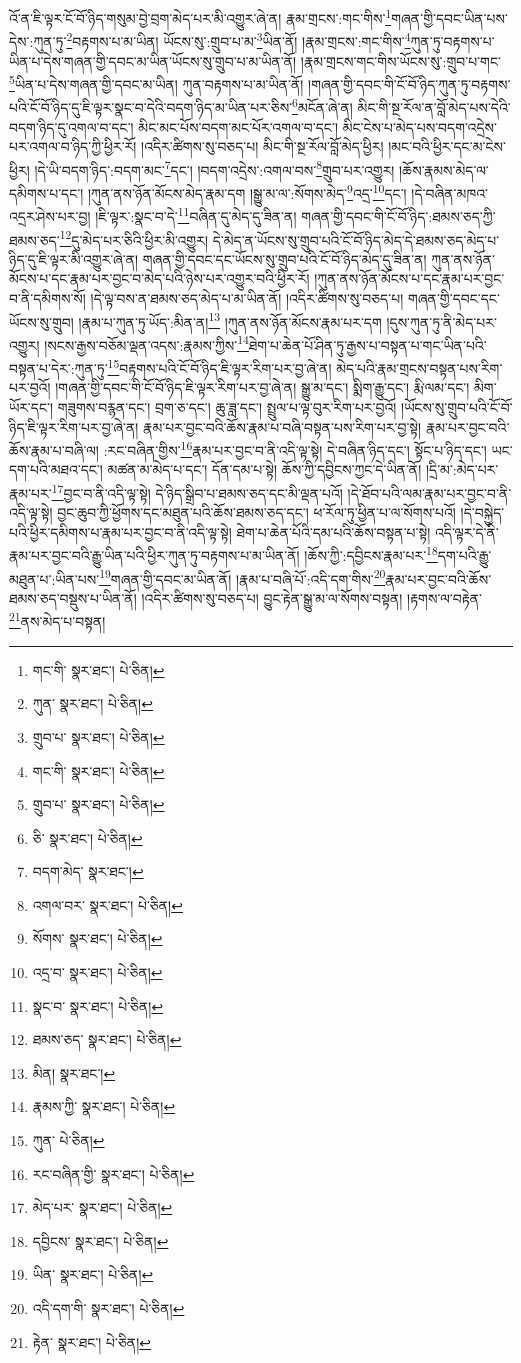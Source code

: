 འོ་ན་ཇི་ལྟར་ངོ་བོ་ཉིད་གསུམ་བྱེ་བྲག་མེད་པར་མི་འགྱུར་ཞེ་ན། རྣམ་གྲངས་:གང་གིས་\footnote{གང་གི་  སྣར་ཐང་།  པེ་ཅིན། }གཞན་གྱི་དབང་ཡིན་པས་དེས་:ཀུན་ཏུ་\footnote{ཀུན་  སྣར་ཐང་།  པེ་ཅིན། }བརྟགས་པ་མ་ཡིན། ཡོངས་སུ་:གྲུབ་པ་མ་\footnote{གྲུབ་པ་  སྣར་ཐང་།  པེ་ཅིན། }ཡིན་ནོ། །རྣམ་གྲངས་:གང་གིས་\footnote{གང་གི་  སྣར་ཐང་།  པེ་ཅིན། }ཀུན་ཏུ་བརྟགས་པ་ཡིན་པ་དེས་གཞན་གྱི་དབང་མ་ཡིན་ཡོངས་སུ་གྲུབ་པ་མ་ཡིན་ནོ། །རྣམ་གྲངས་གང་གིས་ཡོངས་སུ་:གྲུབ་པ་གང་\footnote{གྲུབ་པ་  སྣར་ཐང་།  པེ་ཅིན། }ཡིན་པ་དེས་གཞན་གྱི་དབང་མ་ཡིན། ཀུན་བརྟགས་པ་མ་ཡིན་ནོ། །གཞན་གྱི་དབང་གི་ངོ་བོ་ཉིད་ཀུན་ཏུ་བརྟགས་པའི་ངོ་བོ་ཉིད་དུ་ཇི་ལྟར་སྣང་བ་དེའི་བདག་ཉིད་མ་ཡིན་པར་ཅིས་\footnote{ཅི་  སྣར་ཐང་།  པེ་ཅིན། }མངོན་ཞེ་ན། མིང་གི་སྔ་རོལ་ན་བློ་མེད་པས་དེའི་བདག་ཉིད་དུ་འགལ་བ་དང་། མིང་མང་པོས་བདག་མང་པོར་འགལ་བ་དང་། མིང་ངེས་པ་མེད་པས་བདག་འདྲེས་པར་འགལ་བ་ཉིད་ཀྱི་ཕྱིར་རོ། །འདིར་ཚིགས་སུ་བཅད་པ། མིང་གི་སྔ་རོལ་བློ་མེད་ཕྱིར། །མང་བའི་ཕྱིར་དང་མ་ངེས་ཕྱིར། །དེ་ཡི་བདག་ཉིད་:བདག་མང་\footnote{བདག་མེད་  སྣར་ཐང་། }དང་། །བདག་འདྲེས་:འགལ་བས་\footnote{འགལ་བར་  སྣར་ཐང་།  པེ་ཅིན། }གྲུབ་པར་འགྱུར། །ཆོས་རྣམས་མེད་ལ་དམིགས་པ་དང་། །ཀུན་ནས་ཉོན་མོངས་མེད་རྣམ་དག །སྒྱུ་མ་ལ་:སོགས་མེད་\footnote{སོགས་  སྣར་ཐང་།  པེ་ཅིན། }འདྲ་\footnote{འདྲ་བ་  སྣར་ཐང་།  པེ་ཅིན། }དང་། །དེ་བཞིན་མཁའ་འདྲར་ཤེས་པར་བྱ། །ཇི་ལྟར་:སྣང་བ་དེ་\footnote{སྣང་བ་  སྣར་ཐང་།  པེ་ཅིན། }བཞིན་དུ་མེད་དུ་ཟིན་ན། གཞན་གྱི་དབང་གི་ངོ་བོ་ཉིད་:ཐམས་ཅད་ཀྱི་ཐམས་ཅད་\footnote{ཐམས་ཅད་  སྣར་ཐང་།  པེ་ཅིན། }དུ་མེད་པར་ཅིའི་ཕྱིར་མི་འགྱུར། དེ་མེད་ན་ཡོངས་སུ་གྲུབ་པའི་ངོ་བོ་ཉིད་མེད་དེ་ཐམས་ཅད་མེད་པ་ཉིད་དུ་ཇི་ལྟར་མི་འགྱུར་ཞེ་ན། གཞན་གྱི་དབང་དང་ཡོངས་སུ་གྲུབ་པའི་ངོ་བོ་ཉིད་མེད་དུ་ཟིན་ན། ཀུན་ནས་ཉོན་མོངས་པ་དང་རྣམ་པར་བྱང་བ་མེད་པའི་ཉེས་པར་འགྱུར་བའི་ཕྱིར་རོ། །ཀུན་ནས་ཉོན་མོངས་པ་དང་རྣམ་པར་བྱང་བ་ནི་དམིགས་སོ། །དེ་ལྟ་བས་ན་ཐམས་ཅད་མེད་པ་མ་ཡིན་ནོ། །འདིར་ཚིགས་སུ་བཅད་པ། གཞན་གྱི་དབང་དང་ཡོངས་སུ་གྲུབ། །རྣམ་པ་ཀུན་ཏུ་ཡོད་:མིན་ན།\footnote{མིན།  སྣར་ཐང་། } །ཀུན་ནས་ཉོན་མོངས་རྣམ་པར་དག །དུས་ཀུན་ཏུ་ནི་མེད་པར་འགྱུར། །སངས་རྒྱས་བཅོམ་ལྡན་འདས་:རྣམས་ཀྱིས་\footnote{རྣམས་ཀྱི་  སྣར་ཐང་།  པེ་ཅིན། }ཐེག་པ་ཆེན་པོ་ཤིན་ཏུ་རྒྱས་པ་བསྟན་པ་གང་ཡིན་པའི་བསྟན་པ་དེར་:ཀུན་ཏུ་\footnote{ཀུན་  པེ་ཅིན། }བརྟགས་པའི་ངོ་བོ་ཉིད་ཇི་ལྟར་རིག་པར་བྱ་ཞེ་ན། མེད་པའི་རྣམ་གྲངས་བསྟན་པས་རིག་པར་བྱའོ། །གཞན་གྱི་དབང་གི་ངོ་བོ་ཉིད་ཇི་ལྟར་རིག་པར་བྱ་ཞེ་ན། སྒྱུ་མ་དང་། སྨིག་རྒྱུ་དང་། རྨི་ལམ་དང་། མིག་ཡོར་དང་། གཟུགས་བརྙན་དང་། བྲག་ཅ་དང་། ཆུ་ཟླ་དང་། སྤྲུལ་པ་ལྟ་བུར་རིག་པར་བྱའོ། །ཡོངས་སུ་གྲུབ་པའི་ངོ་བོ་ཉིད་ཇི་ལྟར་རིག་པར་བྱ་ཞེ་ན། རྣམ་པར་བྱང་བའི་ཆོས་རྣམ་པ་བཞི་བསྟན་པས་རིག་པར་བྱ་སྟེ། རྣམ་པར་བྱང་བའི་ཆོས་རྣམ་པ་བཞི་ལ། :རང་བཞིན་གྱིས་\footnote{རང་བཞིན་གྱི་  སྣར་ཐང་།  པེ་ཅིན། }རྣམ་པར་བྱང་བ་ནི་འདི་ལྟ་སྟེ། དེ་བཞིན་ཉིད་དང་། སྟོང་པ་ཉིད་དང་། ཡང་དག་པའི་མཐའ་དང་། མཚན་མ་མེད་པ་དང་། དོན་དམ་པ་སྟེ། ཆོས་ཀྱི་དབྱིངས་ཀྱང་དེ་ཡིན་ནོ། །དྲི་མ་:མེད་པར་རྣམ་པར་\footnote{མེད་པར་  སྣར་ཐང་།  པེ་ཅིན། }བྱང་བ་ནི་འདི་ལྟ་སྟེ། དེ་ཉིད་སྒྲིབ་པ་ཐམས་ཅད་དང་མི་ལྡན་པའོ། །དེ་ཐོབ་པའི་ལམ་རྣམ་པར་བྱང་བ་ནི་འདི་ལྟ་སྟེ། བྱང་ཆུབ་ཀྱི་ཕྱོགས་དང་མཐུན་པའི་ཆོས་ཐམས་ཅད་དང་། ཕ་རོལ་ཏུ་ཕྱིན་པ་ལ་སོགས་པའོ། །དེ་བསྐྱེད་པའི་ཕྱིར་དམིགས་པ་རྣམ་པར་བྱང་བ་ནི་འདི་ལྟ་སྟེ། ཐེག་པ་ཆེན་པོའི་དམ་པའི་ཆོས་བསྟན་པ་སྟེ། འདི་ལྟར་དེ་ནི་རྣམ་པར་བྱང་བའི་རྒྱུ་ཡིན་པའི་ཕྱིར་ཀུན་ཏུ་བརྟགས་པ་མ་ཡིན་ནོ། །ཆོས་ཀྱི་:དབྱིངས་རྣམ་པར་\footnote{དབྱིངས་  སྣར་ཐང་།  པེ་ཅིན། }དག་པའི་རྒྱུ་མཐུན་པ་:ཡིན་པས་\footnote{ཡིན་  སྣར་ཐང་།  པེ་ཅིན། }གཞན་གྱི་དབང་མ་ཡིན་ནོ། །རྣམ་པ་བཞི་པོ་:འདི་དག་གིས་\footnote{འདི་དག་གི་  སྣར་ཐང་།  པེ་ཅིན། }རྣམ་པར་བྱང་བའི་ཆོས་ཐམས་ཅད་བསྡུས་པ་ཡིན་ནོ། །འདིར་ཚིགས་སུ་བཅད་པ། བྱུང་རྟེན་སྒྱུ་མ་ལ་སོགས་བསྟན། །རྟགས་ལ་བརྟེན་\footnote{རྟེན་  སྣར་ཐང་།  པེ་ཅིན། }ནས་མེད་པ་བསྟན། 